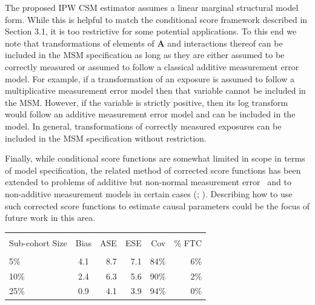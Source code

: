 \documentclass[12pt]{article}
\newcounter{tblcap}
\def\tblhead#1{\hline\\[-9pt]#1\\\hline\\[-9.75pt]}
\def\lastline{\\\hline}
\begin{document}
The proposed IPW CSM estimator assumes a linear marginal structural model form. While this is helpful to match the conditional score framework described in Section 3.1, it is too restrictive for some potential applications. To this end we note that transformations of elements of $\bm{A}$ and interactions thereof can be included in the MSM specification as long as they are either assumed to be correctly measured or assumed to follow a classical additive measurement error model. For example, if a transformation of an exposure is assumed to follow a multiplicative measurement error model then that variable cannot be included in the MSM. However, if the variable is strictly positive, then its log transform would follow an additive measurement error model and can be included in the model. In general, transformations of correctly measured exposures can be included in the MSM specification without restriction.

Finally, while conditional score functions are somewhat limited in scope in terms of model specification, the related method of corrected score functions has been extended to problems of additive but non-normal measurement error~\citep{buzas1996} and to non-additive measurement models in certain cases (\citealp{nakamura1990}; \citealp*{li2004}). Describing how to use such corrected score functions to estimate causal parameters could be the focus of future work in this area.

\newpage
\begin{Large}

\begin{table}[h]
{\tabcolsep=6.25pt
\begin{tabular}{@{}lcrrrr@{}}
\tblhead{Sub-cohort Size & Bias & ASE & ESE & Cov & \% FTC}
5\% & 4.1 & 8.7 & 7.1 & 84\% & 6\% \\
10\% & 2.4 & 6.3 & 5.6 & 90\% & 2\% \\
25\% & 0.9 & 4.1 & 3.9 & 94\% & 0\%
\lastline
\end{tabular}}
\end{table}

\end{Large}
\newpage
\end{document}
